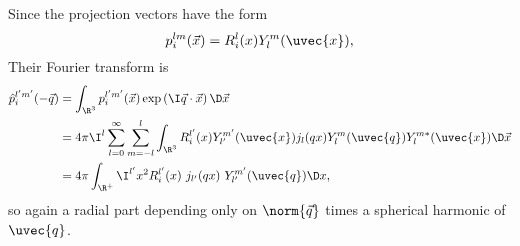 \documentclass{MFHarticle}
\begin{document}
Since the projection vectors have the form
\[ p_i^{lm}(\vec{x}) = R_i^l(x) Y_l^m(\uvec{x}), \]
Their Fourier transform is
\begin{align*}
	\hat{p}_i^{l'm'}(-\vec{q})
	&= \int_{\R^3} p_i^{l'm'}(\vec{x}) \exp\left(\I \vec{q} \cdot \vec{x}\right) \D\vec{x} \\
	&= 4 \pi \I^l \sum_{l = 0}^\infty
	\sum_{m = -l}^l \int_{\R^3}
	R_i^{l'}(x) Y_{l'}^{m'}(\uvec{x})
	j_l(q x) Y_l^m(\uvec{q}) Y_l^{m\ast}(\uvec{x})
	\D\vec{x} \\
	&= 4 \pi
	\int_{\R^+} \I^{l'} x^2 R_i^{l'}(x) \ j_{l'}(q x)
	\
	Y_{l'}^{m'}(\uvec{q}) \D x,
\end{align*}
so again a radial part depending only on $\norm{\vec{q}}$
times a spherical harmonic of $\uvec{q}$.



\end{document}
